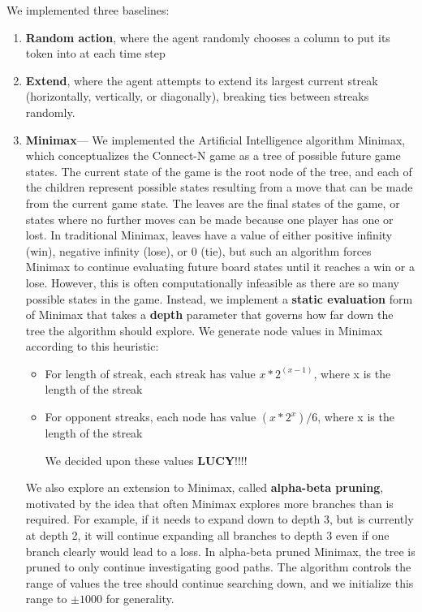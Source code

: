 \documentclass[12pt]{article}
\begin{document}
We implemented three baselines:
\begin{enumerate}
\item \textbf{Random action}, where the agent randomly chooses a column to put its token into at each time step
\item \textbf{Extend}, where the agent attempts to extend its largest current streak (horizontally, vertically, or diagonally), breaking ties between streaks randomly.
\item \textbf{Minimax}--- We implemented the Artificial Intelligence algorithm Minimax, which conceptualizes the Connect-N game as a tree of possible future game states. The current state of the game is the root node of the tree, and each of the children represent possible states resulting from a move that can be made from the current game state. The leaves are the final states of the game, or states where no further moves can be made because one player has one or lost. In traditional Minimax, leaves have a value of either positive infinity (win), negative infinity (lose), or 0 (tie), but such an algorithm forces Minimax to continue evaluating future board states until it reaches a win or a lose. However, this is often computationally infeasible as there are so many possible states in the game. Instead, we implement a \textbf{static evaluation} form of Minimax that takes a \textbf{depth} parameter that governs how far down the tree the algorithm should explore. We generate node values in Minimax according to this heuristic:

\begin{itemize}

\item For length of streak, each streak has value $x * 2^(x-1)$, where x is the length of the streak
\item For opponent streaks, each node has value $(x *  2^x) / 6$, where x is the length of the streak

We decided upon these values \textbf{LUCY}!!!!

\end{itemize}

We also explore an extension to Minimax, called \textbf{alpha-beta pruning}, motivated by the idea that often Minimax explores more branches than is required. For example, if it needs to expand down to depth 3, but is currently at depth 2, it will continue expanding all branches to depth 3 even if one branch clearly would lead to a loss. In alpha-beta pruned Minimax, the tree is pruned to only continue investigating good paths. The algorithm controls the range of values the tree should continue searching down, and we initialize this range to $\pm 1000$ for generality.

\end{enumerate}
\end{document}
